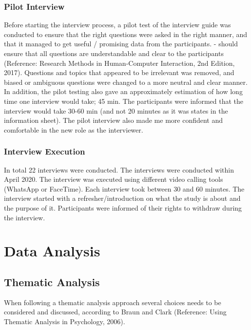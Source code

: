         \subsubsection{Pilot Interview}
Before starting the interview process, a pilot test of the interview guide was conducted to ensure that the right questions were asked in the right manner, and that  it managed to get useful / promising data from the participants. - should ensure that all questions are understandable and clear to the participants (Reference: Research Methods in Human-Computer Interaction, 2nd Edition, 2017). Questions and topics that appeared to be irrelevant was removed, and biased or ambiguous questions were changed to a more neutral and clear manner. In addition, the pilot testing also gave an approximately estimation of how long time one interview would take; 45 min. The participants were informed that the interview would take 30-60 min (and not 20 minutes as it was states in the information sheet).
        The pilot interview also made me more confident and comfortable in the new role as the interviewer.
        
        \subsubsection{Interview Execution}
        In total 22 interviews were conducted. The interviews were conducted within April 2020. The interview was executed using different video calling tools (WhatsApp or FaceTime). Each interview took between 30 and 60 minutes.  
        The interview started with a refresher/introduction on what the study is about and the purpose of it. Participants were informed of their rights to withdraw during the interview. 
\section{Data Analysis}
    \subsection{Thematic Analysis}
    When following a thematic analysis approach several choices needs to be considered and discussed, according to Braun and Clark (Reference: Using Thematic Analysis in Psychology, 2006). 
    
